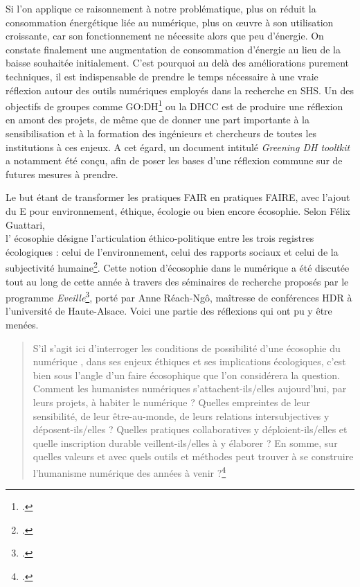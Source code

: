 \documentclass[a4paper,12pt,twoside]{book}
\begin{document}
Si l'on applique ce raisonnement à notre problématique, plus on réduit la consommation énergétique liée au numérique, plus on \oe{}uvre à son utilisation croissante, car son fonctionnement ne nécessite alors que peu d'énergie. On constate finalement une augmentation de consommation d'énergie au lieu de la baisse souhaitée initialement.
C'est pourquoi au delà des améliorations purement techniques, il est indispensable de prendre le temps nécessaire à une vraie réflexion autour des outils numériques employés dans la recherche en SHS. Un des objectifs de groupes comme GO:DH\footcite{godh} ou la  \acrfull{DHCC} est de produire une réflexion en amont des projets, de même que de donner une part importante à la sensibilisation et à la formation des ingénieurs et chercheurs de toutes les institutions à ces enjeux. A cet égard, un document intitulé \og \textit{Greening DH tooltkit} \fg{} a notamment été conçu, afin de poser les bases d'une réflexion commune sur de futures mesures à prendre.

Le but étant de transformer les pratiques FAIR en pratiques FAIRE, avec l'ajout du E pour environnement, éthique, écologie ou bien encore écosophie. Selon Félix Guattari, \\l' \og écosophie \fg{} désigne \og l'articulation éthico-politique entre les trois registres écologiques : celui de l'environnement, celui des rapports sociaux et celui de la subjectivité humaine\fg\footcite{guattari_les_2016}. Cette notion d'écosophie dans le numérique a été discutée tout au long de cette année à travers des séminaires de recherche proposés par le programme \textit{Eveille}\footcite{eveille}, porté par Anne Réach-Ngô, maîtresse de conférences HDR à l'université de Haute-Alsace. Voici une partie des réflexions qui ont pu y être menées.

\begin{quote}
    S'il s'agit ici d'interroger les conditions de possibilité d'une \og écosophie du numérique \fg, dans ses enjeux éthiques et ses implications écologiques, c'est bien sous l'angle d'un \og faire écosophique\fg{} que l'on considérera la question. Comment les humanistes numériques s'attachent-ils/elles aujourd'hui, par leurs projets, à \og habiter\fg{} le numérique ? Quelles empreintes de leur sensibilité, de leur être-au-monde, de leurs relations intersubjectives y déposent-ils/elles ? Quelles pratiques collaboratives y déploient-ils/elles et quelle inscription durable veillent-ils/elles à y élaborer ? En somme, sur quelles valeurs et avec quels outils et méthodes peut trouver à se construire l'humanisme numérique des années à venir ?\footcite{eveille}
\end{quote}
\end{document}
